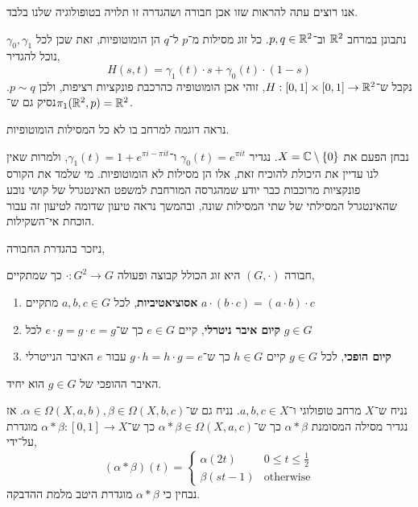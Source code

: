 אנו רוצים עתה להראות שזו אכן חבורה ושהגדרה זו תלויה בטופולוגיה שלנו בלבד.
\begin{example}
	נתבונן במרחב $\mathbb{R}^2$ וב־$p, q \in \mathbb{R}^2$.
	כל זוג מסילות מ־$p$ ל־$q$ הן הומוטופיות, זאת שכן לכל $\gamma_0, \gamma_1$ נוכל להגדיר,
	\[
		H(s, t)
		= \gamma_1(t) \cdot s + \gamma_0(t) \cdot (1 - s)
	\]
	נקבל ש־$H : [0, 1] \times [0, 1] \to \mathbb{R}^2$,
	זוהי אכן הומוטופיה כהרכבת פונקציות רציפות, ולכן $p \sim q$.
	נסיק גם ש־$\pi_1(\mathbb{R}^2, p) = \mathbb{R}^2$.
\end{example}
נראה דוגמה למרחב בו לא כל המסילות הומוטופיות.
\begin{example}
	נבחן הפעם את $X = \mathbb{C} \setminus \{ 0 \}$.
	נגדיר $\gamma_0(t) = e^{\pi i t}$ ו־$\gamma_1(t) = 1 + e^{\pi i - \pi i t}$,
	ולמרות שאין לנו עדיין את היכולת להוכיח זאת, אלו הן מסילות לא הומוטופיות.
	מי שלמד את הקורס פונקציות מרוכבות כבר יודע שמהגרסה המורחבת למשפט האינטגרל של קושי נובע שהאינטגרל המסילתי של שתי המסילות שונה, ובהמשך נראה טיעון שדומה לטיעון זה עבור הוכחת אי־השקילות.
\end{example}
ניזכר בהגדרת החבורה,
\begin{definition}[חבורה]
	חבורה $(G, \cdot)$ היא זוג הכולל קבוצה ופעולה $\cdot : G^2 \to G$ כך שמתקיים,
	\begin{enumerate}
		\item \textbf{אסוציאטיביות}, לכל $a, b, c \in G$ מתקיים $a \cdot (b \cdot c) = (a \cdot b) \cdot c$
		\item \textbf{קיום איבר ניטרלי}, קיים $e \in G$ כך ש־$e \cdot g = g \cdot e = g$ לכל $g \in G$
		\item \textbf{קיום הופכי}, לכל $g \in G$ קיים $h \in G$ כך ש־$g \cdot h = h \cdot g = e$ עבור $e$ האיבר הנייטרלי
	\end{enumerate}
\end{definition}
\begin{remark}
	האיבר ההופכי של $g \in G$ הוא יחיד.
\end{remark}
\begin{definition}
	נניח ש־$X$ מרחב טופולוגי ו־$a, b, c \in X$.
	נניח גם ש־$\alpha \in \Omega(X, a, b), \beta \in \Omega(X, b, c)$.
	אז נגדיר מסילה המסומנת $\alpha * \beta$ כך ש־$\alpha * \beta \in \Omega(X, a, c)$ כך ש־$\alpha * \beta : [0, 1] \to X$ מוגדרת על־ידי,
	\[
		(\alpha * \beta)(t)
		= \begin{cases}
			\alpha(2t) & 0 \le t \le \frac{1}{2} \\
			\beta(st - 1) & \text{otherwise}
		\end{cases}
	\]
	נבחין כי $\alpha * \beta$ מוגדרת היטב מלמת ההדבקה.
\end{definition}
